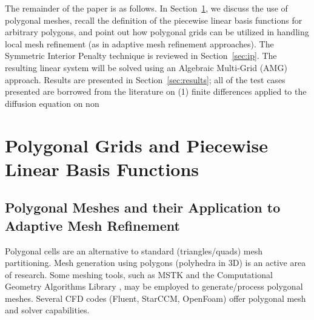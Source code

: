 \documentclass[preprint,10pt]{elsarticle}
\newcommand{\sct}[1]{Section~\ref{#1}}                   %
\renewcommand{\(}{\left(}
\renewcommand{\)}{\right)}
\renewcommand{\[}{\left[}
\renewcommand{\]}{\right]}
\begin{document}
The remainder of the paper is as follows. In \sct{sec:poly}, we discuss
the use of polygonal meshes, recall the definition of the piecewise linear
basis functions for arbitrary polygons, and point out how polygonal grids
can be utilized in handling local mesh refinement (as in adaptive mesh refinement 
approaches). The Symmetric Interior Penalty technique is reviewed in \sct{sec:ip}.
The resulting linear system will be solved using an Algebraic Multi-Grid (AMG) approach.
Results are presented in \sct{sec:results}; all of the test cases presented
are borrowed from the literature on (1) finite differences applied to the
diffusion equation on non 

\section{Polygonal Grids and Piecewise Linear Basis Functions} \label{sec:poly}
\subsection{Polygonal Meshes and their Application to Adaptive Mesh Refinement}

Polygonal cells are an alternative to standard (triangles/quads) mesh partitioning.
Mesh generation using polygons (polyhedra in 3D) is an active area of research.
Some meshing tools, such as MSTK \cite{mstk} and the Computational Geometry Algorithms 
Library \cite{cgal}, may be employed to generate/process polygonal meshes.  
Several CFD codes (Fluent, StarCCM, OpenFoam) offer polygonal mesh and solver capabilities. 
\end{document}
